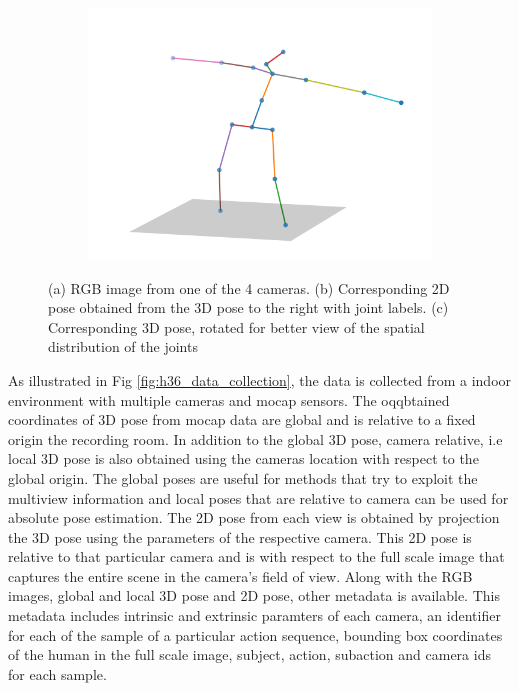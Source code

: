 \begin{figure}
\begin{subfigure}[b]{0.3\textwidth}
        \caption{}
    \end{subfigure}
    \hfill
    \begin{subfigure}[b]{0.3\textwidth}
        \centering
        \includegraphics[width=\textwidth]{figures/h36_viz/h363d.png}
        \caption{}
    \end{subfigure}

    \caption{(a) RGB image from one of the 4 cameras. (b) Corresponding 2D pose obtained from the 3D pose to the right with joint labels. (c) Corresponding 3D pose, rotated for better view of the spatial distribution of the joints}

    \label{fig:h36_sample}
\end{figure}

As illustrated in Fig \ref{fig:h36_data_collection}, the data is collected from a indoor environment with multiple cameras and \ac{mocap} sensors. The oqqbtained coordinates of 3D pose from \ac{mocap} data are global and is relative to a fixed origin the recording room. In addition to the global 3D pose, camera relative, i.e local 3D pose is also obtained using the cameras location with respect to the global origin. The global poses are useful for methods that try to exploit the multiview information and local poses that are relative to camera can be used for absolute pose estimation. The 2D pose from each view is obtained by projection the 3D pose using the parameters of the respective camera. This 2D pose is relative to that particular camera and is with respect to the full scale image that captures the entire scene in the camera's field of view. Along with the RGB images, global and local 3D pose and 2D pose, other metadata is available. This metadata includes intrinsic and extrinsic paramters of each camera, an identifier for each of the sample of a particular action sequence, bounding box coordinates of the human in the full scale image, subject, action, subaction and camera ids for each sample. 


